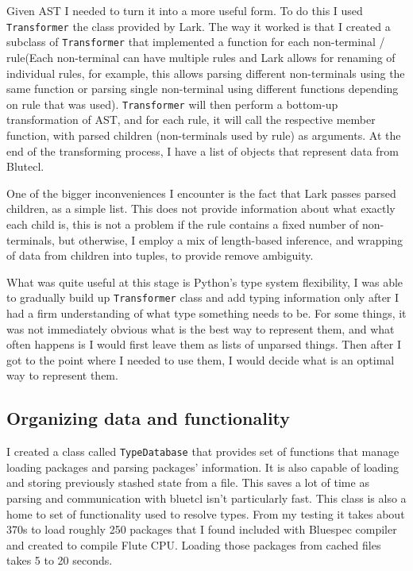 \documentclass[12pt]{report}
\begin{document}
Given AST I needed to turn it into a more useful form. To do this I used \verb!Transformer! the class provided by Lark. The way it worked is that I created a subclass of \verb!Transformer! that implemented a function for each non-terminal / rule(Each non-terminal can have multiple rules and Lark allows for renaming of individual rules, for example, this allows parsing different non-terminals using the same function or parsing single non-terminal using different functions depending on rule that was used). \verb!Transformer! will then perform a bottom-up transformation of AST, and for each rule, it will call the respective member function, with parsed children (non-terminals used by rule) as arguments. At the end of the transforming process, I have a list of objects that represent data from Blutecl.  
\par
One of the bigger inconveniences I encounter is the fact that Lark passes parsed children, as a simple list. This does not provide information about what exactly each child is, this is not a problem if the rule contains a fixed number of non-terminals, but otherwise, I employ a mix of length-based inference, and wrapping of data from children into tuples, to provide remove ambiguity.  
\par
What was quite useful at this stage is Python's type system flexibility, I was able to gradually build up \verb!Transformer! class and add typing information only after I had a firm understanding of what type something needs to be. For some things, it was not immediately obvious what is the best way to represent them, and what often happens is I would first leave them as lists of unparsed things. Then after I got to the point where I needed to use them, I would decide what is an optimal way to represent them. 

\subsection{Organizing data and functionality}
I created a class called \verb!TypeDatabase! that provides set of functions that manage loading packages and parsing packages' information. It is also capable of loading and storing previously stashed state from a  file. This saves a lot of time as parsing and communication with bluetcl isn't particularly fast. This class is also a home to set of functionality used to resolve types. From my testing it takes about 370s to load roughly 250 packages that I found included with Bluespec compiler and created to compile Flute CPU. Loading those packages from cached files takes 5 to 20 seconds.
\end{document}
